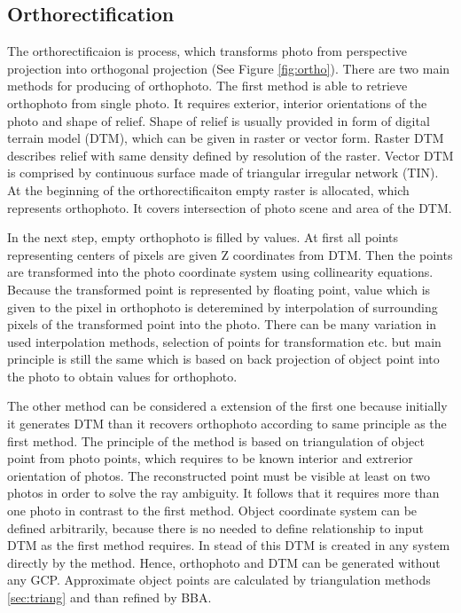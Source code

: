 \documentclass[a4paper,12pt]{article}
\begin{document}
\subsection{Orthorectification}

The orthorectificaion is process, which transforms photo from perspective projection into orthogonal projection (See Figure \ref{fig:ortho}). 
\label{sec:single_ortho}
There are two main methods for producing of orthophoto. The first method is able to retrieve orthophoto 
from single photo. It requires exterior, interior orientations of the photo and shape of relief. 
Shape of relief is usually provided in form of digital terrain model (DTM), which 
can be given in raster or vector form. Raster DTM describes relief with same density defined by resolution of the raster.
Vector DTM is comprised by continuous surface made of triangular irregular network (TIN). 
At the beginning of the orthorectificaiton empty raster is allocated, which represents orthophoto.
It covers intersection of photo scene and area of the DTM.

In the next step, empty orthophoto is filled by values. 
At first all points representing centers of pixels are given Z coordinates from DTM. 
Then the points are transformed into the photo coordinate system using collinearity equations.
Because the transformed point is represented by floating point, value which is given 
to the pixel in orthophoto is deteremined by interpolation of surrounding pixels of the transformed 
point into the photo. There can be many variation in used interpolation methods, selection of points 
for transformation etc. 
but main principle is still the same which is based on back projection of object point into 
the photo to obtain values for orthophoto.

The other method can be considered a extension of the first one because initially it generates DTM than it recovers orthophoto 
according to same principle as the first method. The principle of the method is based on triangulation of object point
from photo points, which requires to be known interior and extrerior orientation of photos. The reconstructed point 
must be visible at least on two photos in order to solve the ray ambiguity. It follows that it requires more than 
one photo in contrast to the first method.
Object coordinate system 
can be defined arbitrarily, because there is no needed to define relationship to input DTM as the first method requires.
In stead of this DTM is created in any system directly by the method.
Hence,  orthophoto and DTM can be generated without any GCP. 
Approximate object points  are calculated by triangulation 
methods \ref{sec:triang} and than refined by BBA. 
\end{document}
